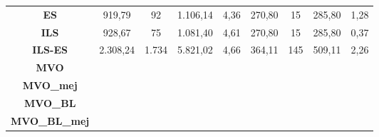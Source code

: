 \begin{table}[H]
{\begin{tabular}{ccccccccc}
\multicolumn{1}{|c|}{\textbf{ES}} & 919,79 & 92 & 1.106,14 & \multicolumn{1}{c|}{4,36} & 270,80 & 15 & 285,80 & \multicolumn{1}{c|}{1,28} \\
\multicolumn{1}{|c|}{\textbf{ILS}} & 928,67 & 75 & 1.081,40 & \multicolumn{1}{c|}{4,61} & 270,80 & 15 & 285,80 & \multicolumn{1}{c|}{0,37} \\
\multicolumn{1}{|c|}{\textbf{ILS-ES}} & 2.308,24 & 1.734 & 5.821,02 & \multicolumn{1}{c|}{4,66} & 364,11 & 145 & 509,11 & \multicolumn{1}{c|}{2,26} \\
\multicolumn{1}{|c|}{\textbf{MVO}} & \multicolumn{1}{l}{} & \multicolumn{1}{l}{} & \multicolumn{1}{l}{} & \multicolumn{1}{l|}{} & \multicolumn{1}{l}{} & \multicolumn{1}{l}{} & \multicolumn{1}{l}{} & \multicolumn{1}{l|}{} \\
\multicolumn{1}{|c|}{\textbf{MVO\_mej}} & \multicolumn{1}{l}{} & \multicolumn{1}{l}{} & \multicolumn{1}{l}{} & \multicolumn{1}{l|}{} & \multicolumn{1}{l}{} & \multicolumn{1}{l}{} & \multicolumn{1}{l}{} & \multicolumn{1}{l|}{} \\
\multicolumn{1}{|c|}{\textbf{MVO\_BL}} & \multicolumn{1}{l}{} & \multicolumn{1}{l}{} & \multicolumn{1}{l}{} & \multicolumn{1}{l|}{} & \multicolumn{1}{l}{} & \multicolumn{1}{l}{} & \multicolumn{1}{l}{} & \multicolumn{1}{l|}{} \\
\multicolumn{1}{|c|}{\textbf{MVO\_BL\_mej}} & \multicolumn{1}{l}{} & \multicolumn{1}{l}{} & \multicolumn{1}{l}{} & \multicolumn{1}{l|}{} & \multicolumn{1}{l}{} & \multicolumn{1}{l}{} & \multicolumn{1}{l}{} & \multicolumn{1}{l|}{} \\ \hline
\end{tabular}
}
\end{table}
